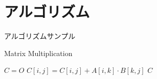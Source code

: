 \documentclass[14pt,aspectratio=169,xcolor=dvipsnames,table,dvipdfmx]{beamer}
\theoremstyle{definition}
\begin{document}
\section{アルゴリズム}
\begin{frame}{アルゴリズムサンプル}
    \begin{block}{Matrix Multiplication}
        \begin{algorithmic}[1]
            \STATE $C = O$
            \STATE $C[i,j] = C[i,j] + A[i, k] \cdot B[k, j]$
            \ENDFOR
            \ENDFOR
            \ENDFOR
            \RETURN $C$
        \end{algorithmic}
    \end{block}
\end{frame}
\end{document}
